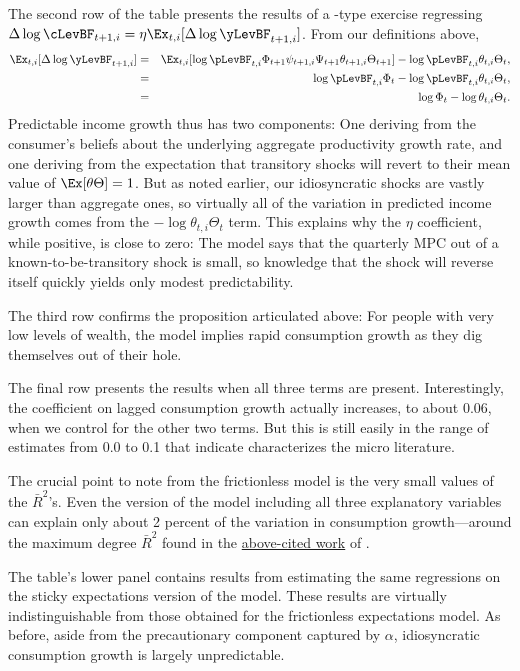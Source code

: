 The second row of the table presents the results of a \cite{cmModel}-type exercise regressing $\Delta \log \cLevBF_{t+1,i} = \eta \Ex_{t,i}[\Delta \log \yLevBF_{t+1,i}]$.  From our definitions above,
\begin{eqnarray*}
  \Ex_{t,i}[\Delta \log \yLevBF_{t+1,i}] & = & \Ex_{t,i}[\log \pLevBF_{t,i}\Phi_{t+1}\psi_{t+1,i}\Psi_{t+1}\theta_{t+1,i}\Theta_{t+1}] - \log \pLevBF_{t,i}\theta_{t,i}\Theta_{t},
  \\ & = & \log \pLevBF_{t,i}\Phi_{t} - \log \pLevBF_{t,i}\theta_{t,i}\Theta_{t},
  \\ & = & \log \Phi_{t} - \log \theta_{t,i}\Theta_{t}.
\end{eqnarray*}
Predictable income growth thus has two components: One deriving from the consumer's beliefs about the underlying aggregate productivity growth rate, and one deriving from the expectation that transitory shocks will revert to their mean value of $\Ex[\theta \Theta]=1$.  But as noted earlier, our idiosyncratic shocks are vastly larger than aggregate ones, so virtually all of the variation in predicted income growth comes from the $-\log \theta_{t,i}\Theta_{t}$ term.  This explains why the $\eta$ coefficient, while positive, is close to zero: The model says that the quarterly MPC out of a known-to-be-transitory shock is small, so knowledge that the shock will reverse itself quickly yields only modest predictability.

The third row confirms the proposition articulated above: For people with very low levels of wealth, the model implies rapid consumption growth as they dig themselves out of their hole.

The final row presents the results when all three terms are present.  Interestingly, the coefficient on lagged consumption growth actually increases, to about 0.06, when we control for the other two terms.  But this is still easily in the range of estimates from 0.0 to 0.1 that \cite{hrsHabit} indicate characterizes the micro literature.

The crucial point to note from the frictionless model is the very small values of the $\bar{R}^{2}$'s.  Even the version of the model including all three explanatory variables can explain only about 2 percent of the variation in consumption growth---around the maximum degree $\bar{R}^{2}$ found in the \hyperlink{dynanR2}{above-cited work} of \cite{dynanHabits}.

The table's lower panel contains results from estimating the same regressions on the sticky expectations version of the model.  These results are virtually indistinguishable from those obtained for the frictionless expectations model.  As before, aside from the precautionary component captured by $\alpha$, idiosyncratic consumption growth is largely unpredictable.

